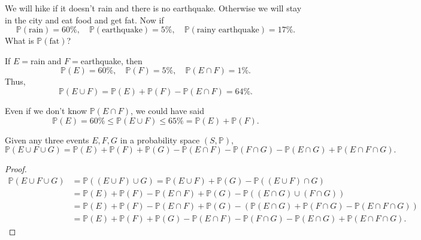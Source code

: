\begin{eg}
    We will hike if it doesn't rain and there is no earthquake. Otherwise we will stay in the city and eat food and get fat. Now if 
    \[
        \mathbb{P} (\text{rain} ) = 60\%, \quad \mathbb{P} (\text{earthquake})=5\%, \quad \mathbb{P} (\text{rainy earthquake} ) = 17\%.
    \]
    What is \(\mathbb{P} (\text{fat} )\)? 
\end{eg}
\begin{explanation}
    If \(E=\)rain and \(F=\)earthquake, then 
    \[
        \mathbb{P} (E) = 60 \%, \quad \mathbb{P} (F) = 5 \%, \quad \mathbb{P} (E \cap F) = 1\%.
    \]  
    Thus, 
    \[
        \mathbb{P} (E \cup F) = \mathbb{P} (E) + \mathbb{P} (F) - \mathbb{P} (E \cap F) = 64 \%.
    \]
    \begin{remark}
        Even if we don't know \(\mathbb{P} (E \cap F)\), we could have said 
        \[
             \mathbb{P} (E) = 60 \% \le \mathbb{P} (E \cup F) \le 65 \% = \mathbb{P} (E) + \mathbb{P} (F).
        \] 
    \end{remark}
\end{explanation}

\begin{proposition}
    Given any three events \(E, F, G\) in a probability space \((S, \mathbb{P} )\), 
    \[
        \mathbb{P} (E \cup F \cup G) = \mathbb{P} (E) + \mathbb{P} (F) + \mathbb{P} (G) - \mathbb{P} (E \cap F) - \mathbb{P} (F \cap G) - \mathbb{P} (E \cap G) + \mathbb{P} (E \cap F \cap G).
    \]   
\end{proposition}

\begin{proof}
    \begin{align*}
        \mathbb{P} (E \cup F \cup G) &= \mathbb{P} ((E \cup F) \cup G) = \mathbb{P} (E \cup F) + \mathbb{P} (G) - \mathbb{P} ((E \cup F) \cap G) \\
        &= \mathbb{P} (E) + \mathbb{P} (F) - \mathbb{P} (E \cap F) + \mathbb{P} (G) - \mathbb{P} ((E \cap G) \cup (F \cap G)) \\
        &= \mathbb{P} (E) + \mathbb{P} (F) - \mathbb{P} (E \cap F) + \mathbb{P} (G) - \left( \mathbb{P} (E \cap G) + \mathbb{P} (F \cap G) - \mathbb{P} (E \cap F \cap G)  \right) \\
        &= \mathbb{P} (E) + \mathbb{P} (F) + \mathbb{P} (G) - \mathbb{P} (E \cap F) - \mathbb{P} (F \cap G) - \mathbb{P} (E \cap G) + \mathbb{P} (E \cap F \cap G). 
    \end{align*}
\end{proof}


